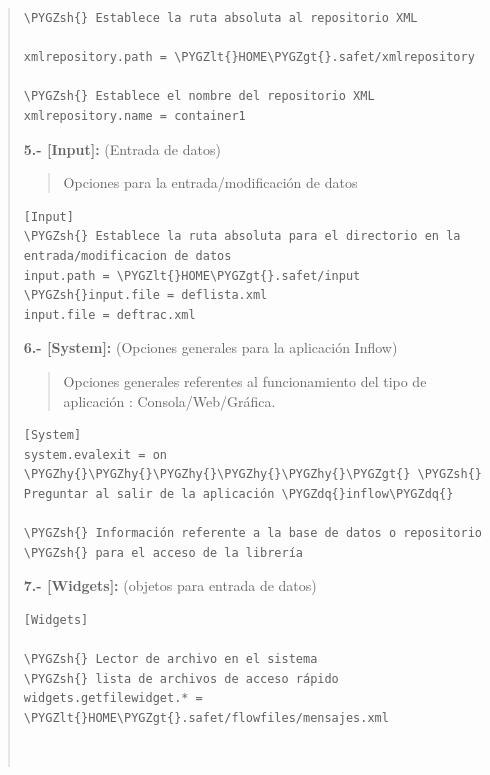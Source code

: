 \documentclass[letterpaper,11pt,spanish]{sphinxmanual}
\def\PYGZlt{\char`\<}
\def\PYGZgt{\char`\>}
\def\PYGZsh{\char`\#}
\def\PYGZhy{\char`\-}
\def\PYGZdq{\char`\"}
\begin{document}
\begin{quote}
\begin{Verbatim}[commandchars=\\\{\}]
\PYGZsh{} Establece la ruta absoluta al repositorio XML

xmlrepository.path = \PYGZlt{}HOME\PYGZgt{}.safet/xmlrepository

\PYGZsh{} Establece el nombre del repositorio XML
xmlrepository.name = container1
\end{Verbatim}

\textbf{5.- {[}Input{]}:} (Entrada de datos)
\begin{quote}

Opciones para la entrada/modificación de datos
\end{quote}

\begin{Verbatim}[commandchars=\\\{\}]
[Input]
\PYGZsh{} Establece la ruta absoluta para el directorio en la entrada/modificacion de datos
input.path = \PYGZlt{}HOME\PYGZgt{}.safet/input
\PYGZsh{}input.file = deflista.xml
input.file = deftrac.xml
\end{Verbatim}

\textbf{6.- {[}System{]}:} (Opciones generales para la aplicación Inflow)
\begin{quote}

Opciones generales referentes al funcionamiento del tipo de aplicación : Consola/Web/Gráfica.
\end{quote}

\begin{Verbatim}[commandchars=\\\{\}]
[System]
system.evalexit = on  \PYGZhy{}\PYGZhy{}\PYGZhy{}\PYGZhy{}\PYGZhy{}\PYGZgt{} \PYGZsh{} Preguntar al salir de la aplicación \PYGZdq{}inflow\PYGZdq{}

\PYGZsh{} Información referente a la base de datos o repositorio
\PYGZsh{} para el acceso de la librería
\end{Verbatim}

\textbf{7.- {[}Widgets{]}:} (objetos para entrada de datos)

\begin{Verbatim}[commandchars=\\\{\}]
[Widgets]

\PYGZsh{} Lector de archivo en el sistema
\PYGZsh{} lista de archivos de acceso rápido
widgets.getfilewidget.* = \PYGZlt{}HOME\PYGZgt{}.safet/flowfiles/mensajes.xml



\end{Verbatim}
\end{quote}
\end{document}
